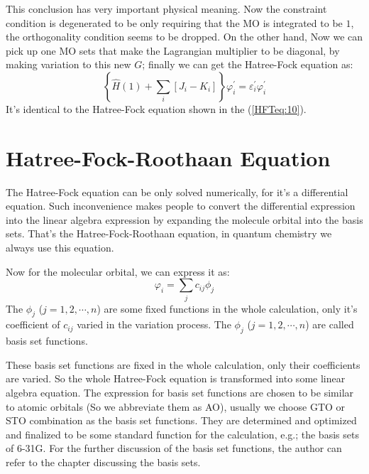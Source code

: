 This conclusion has very important physical meaning. Now the constraint
condition is degenerated to be only requiring that the MO is integrated to be
$1$, the orthogonality condition seems to be dropped. On the other hand, Now we
can pick up one MO sets that make the Lagrangian multiplier to be diagonal, by
making variation to this new $G$; finally we can get the Hatree-Fock equation
as:
\begin{equation}\label{HFTeq:19}
\left\{\hat{H}(1)+ \sum_{i}[J_{i} - K_{i}] \right\}\varphi^{'}_{i} =
\varepsilon^{'}_{i}\varphi^{'}_{i}
\end{equation} 
It's identical to the Hatree-Fock equation shown in the (\ref{HFTeq:10}).



\section{Hatree-Fock-Roothaan Equation}
%
%
The Hatree-Fock equation can be only solved numerically, for it's a
differential equation. Such inconvenience makes people to convert
the differential expression into the linear algebra expression by
expanding the molecule orbital into the basis sets. That's the
Hatree-Fock-Roothaan equation, in quantum chemistry we always use
this equation.

Now for the molecular orbital, we can express it as:
\begin{equation}\label{HFTeq:38}
\varphi_{i} = \sum_{j}c_{ij}\phi_{j}
\end{equation}
The $\phi_{j}$ ($j=1,2,\cdots,n$) are some fixed functions in the whole
calculation, only it's coefficient of $c_{ij}$ varied in the variation process.
The $\phi_{j}$ ($j=1,2,\cdots,n$) are called basis set functions.

These basis set functions are fixed in the whole calculation, only their
coefficients are varied. So the whole Hatree-Fock equation is transformed into
some linear algebra equation. The expression for basis set functions are
chosen to be similar to atomic orbitals (So we abbreviate them as AO), usually
we choose GTO or STO combination as the basis set functions. They are
determined and optimized and finalized to be some standard function for the
calculation, e.g.; the basis sets of 6-31G. For the further discussion of the
basis set functions, the author can refer to the chapter discussing the basis
sets.

